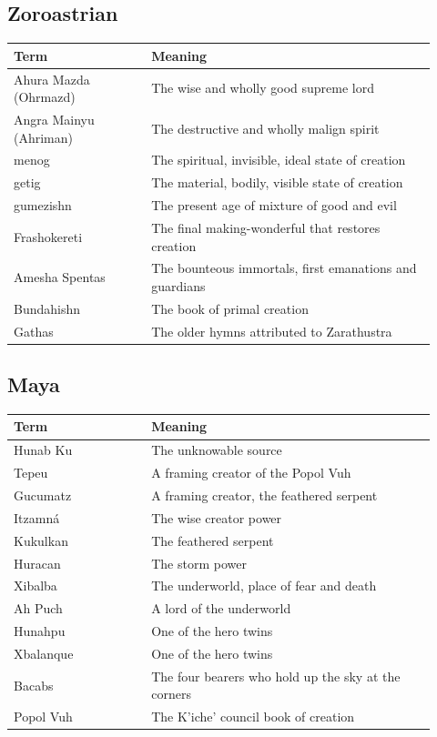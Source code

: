 
\subsection{Zoroastrian}

\begin{longtable}{L{0.30\linewidth} L{0.62\linewidth}}
\toprule
\textbf{Term} & \textbf{Meaning} \\
\midrule
\endhead
Ahura Mazda (Ohrmazd) & The wise and wholly good supreme lord \\
Angra Mainyu (Ahriman) & The destructive and wholly malign spirit \\
menog & The spiritual, invisible, ideal state of creation \\
getig & The material, bodily, visible state of creation \\
gumezishn & The present age of mixture of good and evil \\
Frashokereti & The final making-wonderful that restores creation \\
Amesha Spentas & The bounteous immortals, first emanations and guardians \\
Bundahishn & The book of primal creation \\
Gathas & The older hymns attributed to Zarathustra \\
\bottomrule
\end{longtable}

\subsection{Maya}

\begin{longtable}{L{0.30\linewidth} L{0.62\linewidth}}
\toprule
\textbf{Term} & \textbf{Meaning} \\
\midrule
\endhead
Hunab Ku & The unknowable source \\
Tepeu & A framing creator of the Popol Vuh \\
Gucumatz & A framing creator, the feathered serpent \\
Itzamn\'a & The wise creator power \\
Kukulkan & The feathered serpent \\
Huracan & The storm power \\
Xibalba & The underworld, place of fear and death \\
Ah Puch & A lord of the underworld \\
Hunahpu & One of the hero twins \\
Xbalanque & One of the hero twins \\
Bacabs & The four bearers who hold up the sky at the corners \\
Popol Vuh & The K'iche' council book of creation \\
\bottomrule
\end{longtable}

